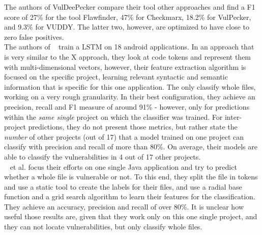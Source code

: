 \documentclass[
	a4paper,
	pagesize,
	pdftex,
	12pt,
	twoside, %
	BCOR=5mm, %
	ngerman,
	fleqn,
	final,
	]{scrartcl}
\begin{document}
The authors of VulDeePecker compare their tool other approaches and find a F1 score of 27\% for the tool Flawfinder, 47\% for Checkmarx, 18.2\% for VulPecker, and 9.3\% for VUDDY. The latter two, however, are optimized to have close to zero false positives.\\

The authors of ~\cite{Dam.2017} train a LSTM on 18 android applications. In an approach that is very similar to the X approach, they look at code tokens and represent them with multi-dimensional vectors, however, their feature extraction algorithm is focused on the specific project, learning relevant syntactic and semantic information that is specific for this one application. The only classify whole files, working on a very rough granularity. In their best configuration, they achieve an precision, recall and F1 measure of around 91\% - however, only for predictions within the \textit{same single} project on which the classifier was trained. For inter-project predictions, they do not present those metrics, but rather state the \textit{number} of other projects (out of 17) that a model trained on one project can classify with precision and recall of more than 80\%. On average, their models are able to classify the vulnerabilities in 4 out of 17 other projects.\\

~\cite{Hovsepyan.2012} et al. focus their efforts on one single Java application and try to predict whether a whole file is vulnerable or not. To this end, they split the file in tokens and use a static tool to create the labels for their files, and use a radial base function and a grid search algorithm to learn their features for the classification. They achieve an accuracy, precision and recall of over 80\%. It is unclear how useful those results are, given that they work only on this one single project, and they can not locate vulnerabilities, but only classify whole files. 
\end{document}

